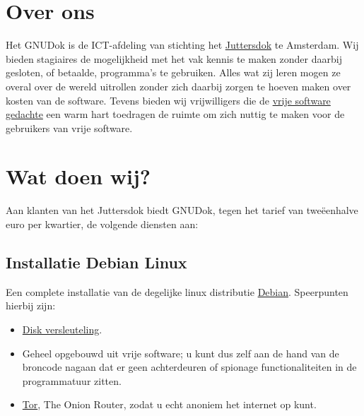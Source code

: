 
\section{Over ons}

Het GNUDok is de ICT-afdeling van stichting het \href{http://www.juttersdok.nl/}{Juttersdok} te Amsterdam. Wij bieden stagiaires de mogelijkheid met het vak kennis te maken zonder daarbij gesloten, of betaalde, programma's te gebruiken. Alles wat zij leren mogen ze overal over de wereld uitrollen zonder zich daarbij zorgen te hoeven maken over kosten van de software. Tevens bieden wij vrijwilligers die de \href{http://www.fsf.org/}{vrije software gedachte} een warm hart toedragen de ruimte om zich nuttig te maken voor de gebruikers van vrije software.

\section{Wat doen wij?}

Aan klanten van het Juttersdok biedt GNUDok, tegen het tarief van twe\"{e}enhalve euro per kwartier, de volgende diensten aan:

\subsection{Installatie Debian Linux}

Een complete installatie van de degelijke linux distributie \href{https://www.debian.org/}{Debian}.
Speerpunten hierbij zijn:

\begin{itemize}
	\item \href{https://wiki.archlinux.org/index.php/Disk_encryption}{Disk versleuteling}.
		\item Geheel opgebouwd uit vrije software; u kunt dus zelf aan de hand van de broncode nagaan dat er geen achterdeuren of spionage functionaliteiten in de programmatuur zitten.
		\item \href{https://www.torproject.org}{Tor}, The Onion Router, zodat u echt anoniem het internet op kunt.
\end{itemize}

